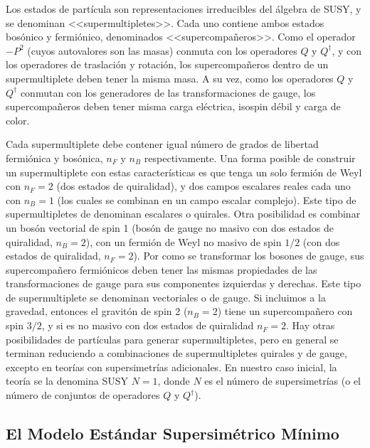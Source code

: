 Los estados de partícula son representaciones irreducibles del álgebra de SUSY, y se denominan <<supermultipletes>>. Cada uno contiene ambos estados bosónico y fermiónico, denominados <<supercompañeros>>. Como el operador $-P^2$ (cuyos autovalores son las masas) conmuta con los operadores $Q$ y $Q^{\dagger}$, y con los operadores de traslación y rotación, los supercompañeros dentro de un supermultiplete deben tener la misma masa. A su vez, como los operadores $Q$ y $Q^{\dagger}$ conmutan con los generadores de las transformaciones de gauge, los supercompañeros deben tener misma carga eléctrica, isospin débil y carga de color.

Cada supermultiplete debe contener igual número de grados de libertad fermiónica y bosónica, $n_F$ y $n_B$ respectivamente. Una forma posible de construir un supermultiplete con estas características es que tenga un solo fermión de Weyl con $n_F=2$ (dos estados de quiralidad),
y dos campos escalares reales cada uno con $n_B=1$ (los cuales se combinan en un campo escalar complejo). Este tipo de supermultipletes de denominan escalares o quirales. Otra posibilidad es combinar un bosón vectorial de spin 1 (bosón de gauge no masivo con dos estados de quiralidad, $n_B=2$), con un fermión de Weyl no masivo de spin $1/2$ (con dos estados de quiralidad, $n_F=2$). Por como se transformar los bosones de gauge, sus supercompañero fermiónicos deben tener las mismas propiedades de las transformaciones de gauge para sus componentes izquierdas y derechas. Este tipo de supermultiplete se denominan vectoriales o de gauge. 
Si incluimos a la gravedad, entonces el gravitón \cite{Anduaga:1433401} de spin 2 ($n_B=2$) tiene un supercompañero con spin $3/2$, y si es no masivo con dos estados de quiralidad $n_F=2$. 
Hay otras posibilidades de partículas para generar supermultipletes, pero en general se terminan reduciendo a combinaciones de supermultipletes quirales y de gauge, excepto en teorías con supersimetrías adicionales. En nuestro caso inicial, la teoría se la denomina SUSY $N=1$, donde $N$ es el número de supersimetrías (o el número de conjuntos de operadores $Q$ y $Q^{\dagger}$). 

\subsection{El Modelo Estándar Supersimétrico Mínimo}

